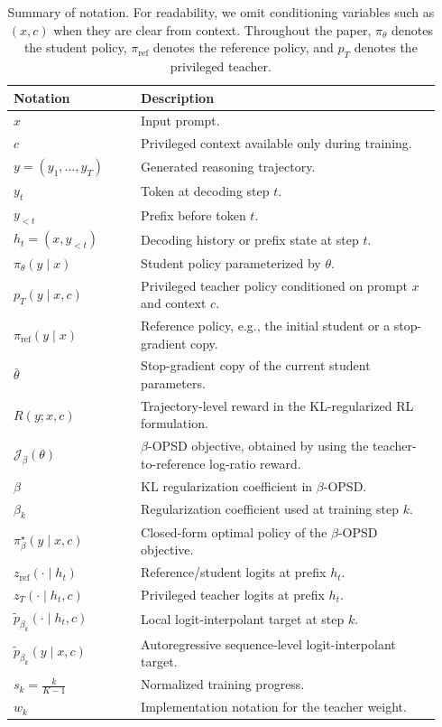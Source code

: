\begin{table}[hbt]
\centering
\small
\caption{
Summary of notation. For readability, we omit conditioning variables such as $(x,c)$
when they are clear from context. Throughout the paper, $\pi_\theta$ denotes the student
policy, $\pi_{\mathrm{ref}}$ denotes the reference policy, and $p_T$ denotes the privileged
teacher.
}
\label{tab:notation}
\begin{tabular}{p{0.28\linewidth}p{0.66\linewidth}}
\toprule
\textbf{Notation} & \textbf{Description} \\
\midrule

$x$ & Input prompt. \\
$c$ & Privileged context available only during training. \\
$y=(y_1,\ldots,y_T)$ & Generated reasoning trajectory. \\
$y_t$ & Token at decoding step $t$. \\
$y_{<t}$ & Prefix before token $t$. \\
$h_t=(x,y_{<t})$ & Decoding history or prefix state at step $t$. \\

\midrule

$\pi_\theta(y\mid x)$ & Student policy parameterized by $\theta$. \\
$p_T(y\mid x,c)$ & Privileged teacher policy conditioned on prompt $x$ and context $c$. \\
$\pi_{\mathrm{ref}}(y\mid x)$ & Reference policy, e.g., the initial student or a stop-gradient copy. \\
$\bar{\theta}$ & Stop-gradient copy of the current student parameters. \\

\midrule

$R(y;x,c)$ & Trajectory-level reward in the KL-regularized RL formulation. \\
$\mathcal{J}_{\beta}(\theta)$ & $\beta$-OPSD objective, obtained by using the teacher-to-reference log-ratio reward. \\
$\beta$ & KL regularization coefficient in $\beta$-OPSD. \\
$\beta_k$ & Regularization coefficient used at training step $k$. \\
$\pi_{\beta}^{\star}(y\mid x,c)$ & Closed-form optimal policy of the $\beta$-OPSD objective. \\


\midrule

$z_{\mathrm{ref}}(\cdot\mid h_t)$ & Reference/student logits at prefix $h_t$. \\
$z_T(\cdot\mid h_t,c)$ & Privileged teacher logits at prefix $h_t$. \\
$\tilde p_{\beta_k}(\cdot\mid h_t,c)$ & Local logit-interpolant target at step $k$. \\
$\tilde p_{\beta_k}(y\mid x,c)$ & Autoregressive sequence-level logit-interpolant target. \\
$s_k=\frac{k}{K-1}$ & Normalized training progress. \\
$w_{k}$ & Implementation notation for the teacher weight. \\


\end{tabular}
\end{table}
